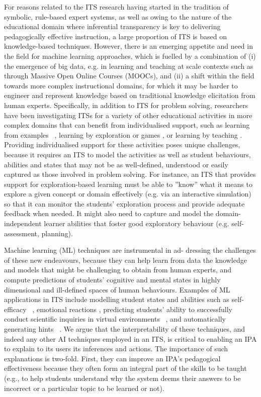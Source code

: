 \documentclass{article}
\begin{document}
For reasons related to the ITS research having started in the tradition of symbolic, rule-based expert systems, as well as owing to the nature of the educational domain where inferential transparency is key to delivering pedagogically effective instruction, a large proportion of ITS is based on knowledge-based techniques. However, there is an emerging appetite and need in the field for machine learning approaches, which is fuelled by a combination of (i) the emergence of big data, e.g. in learning and teaching at scale contexts such as through Massive Open Online Courses (MOOCs), and (ii) a shift within the field towards more complex instructional domains, for which it may be harder to engineer and represent knowledge based on traditional knowledge elicitation from human experts. Specifically, in addition to ITS for problem solving, researchers have been investigating ITSs for a variety of other educational activities in more complex domains that can benefit from individualised support, such as learning from examples ~\cite{Conati2009,LongAleven2017}, learning by exploration or games \cite{ConatiSamad2013,Porayska-Pomsta_SHAREIT_2013,italk2learn2017}, or learning by teaching \cite{Biswas2005}. Providing individualised support for these activities poses unique challenges, because it requires an ITS to model the activities as well as student behaviours, abilities and states that may not be as well-defined, understood or easily captured as those involved in problem solving. For instance, an ITS that provides support for exploration-based learning must be able to ''know'' what it means to explore a given concept or domain effectively (e.g. via an interactive simulation) so that it can monitor the students' exploration process and provide adequate feedback when needed. It might also need to capture and model the domain-independent learner abilities that foster good exploratory behaviour (e.g. self-assessment, planning).

Machine learning (ML) techniques are instrumental in ad- dressing the challenges of these new endeavours, because they can help learn from data the knowledge and models that might be challenging to obtain from human experts, and compute predictions of students' cognitive and mental states in highly dimensional and ill-defined spaces of human behaviours. Examples of ML applications in ITS include modelling student states and abilities such as self-efficacy ~\cite{mavrikis_modelling_2010}, emotional reactions \cite{ConatiMaclaren2009,Bosch2016,Monkaresi2017}, predicting students' ability to successfully conduct scientific inquiries in virtual environments ~\cite{Baker2016}, and automatically generating hints ~\cite{Stamper2011,conati_student_2013,Fratamico2017}. We argue that the interpretability of these techniques, and indeed any other AI techniques employed in an ITS, is critical to enabling an IPA to explain to its users its inferences and actions. The importance of such explanations is two-fold. First, they can improve an IPA's pedagogical effectiveness because they often form an integral part of the skills to be taught (e.g., to help students understand why the system deems their answers to be incorrect or a particular topic to be learned or not).
\end{document}

